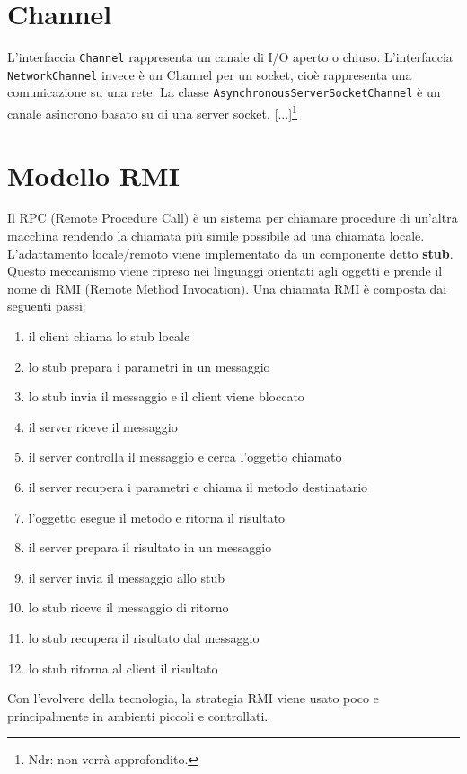 \section{Channel}
L'interfaccia \texttt{Channel} rappresenta un canale di I/O aperto o chiuso. L'interfaccia \texttt{NetworkChannel} invece è un Channel per un socket, cioè rappresenta una comunicazione su una rete. 
La classe \texttt{AsynchronousServerSocketChannel} è un canale asincrono basato su di una server socket. [...]\footnote{Ndr: non verrà approfondito.}

\section{Modello RMI}
Il RPC (Remote Procedure Call) è un sistema per chiamare procedure di un'altra macchina rendendo la chiamata più simile possibile ad una chiamata locale. L'adattamento locale/remoto viene implementato da un componente detto \textbf{stub}. Questo meccanismo viene ripreso nei linguaggi orientati agli oggetti e prende il nome di RMI (Remote Method Invocation). Una chiamata RMI è composta dai seguenti passi:
\begin{enumerate}
\item il client chiama lo stub locale
\item lo stub prepara i parametri in un messaggio
\item lo stub invia il messaggio e il client viene bloccato
\item il server riceve il messaggio
\item il server controlla il messaggio e cerca l'oggetto chiamato
\item il server recupera i parametri e chiama il metodo destinatario
\item l'oggetto esegue il metodo e ritorna il risultato
\item il server prepara il risultato in un messaggio
\item il server invia il messaggio allo stub
\item lo stub riceve il messaggio di ritorno
\item lo stub recupera il risultato dal messaggio
\item lo stub ritorna al client il risultato
\end{enumerate}
Con l'evolvere della tecnologia, la strategia RMI viene usato poco e principalmente in ambienti piccoli e controllati.